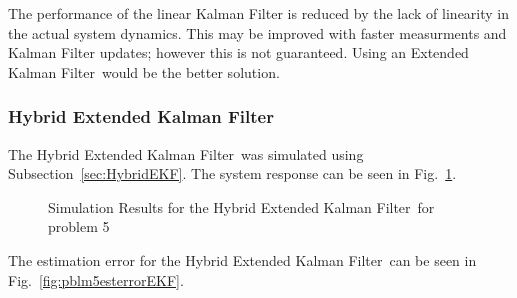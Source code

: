 \documentclass[]{article}
\newcommand{\KF}{Kalman Filter}
\newcommand{\subsectionname}{Subsection}
\renewcommand{\figurename}{Fig.}
\begin{document}
		The performance of the linear Kalman Filter is reduced by the lack of linearity in the actual system dynamics. This may be improved with faster measurments and Kalman Filter updates; however this is not guaranteed. Using an Extended \KF \ would be the better solution.
	
	\newpage
		\subsubsection{Hybrid Extended \KF}
		The Hybrid Extended \KF \ was simulated using \subsectionname \ \ref{sec:HybridEKF}. The system response can be seen in \figurename \ \ref{fig:pblm5resultsEKF}.
		\begin{figure}[h]
			\centering
			\caption{Simulation Results for the Hybrid Extended \KF \ for problem 5}
			\label{fig:pblm5resultsEKF}
		\end{figure}
	\newpage
		The estimation error for the Hybrid Extended \KF \ can be seen in \figurename \ \ref{fig:pblm5esterrorEKF}.\\
\end{document}
